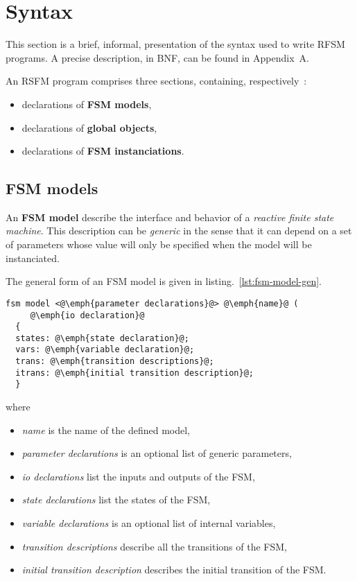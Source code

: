 \chapter{Syntax}
\label{chap:syntax}

This section is a brief, informal, presentation of the syntax used to write RFSM programs. A
precise description, in BNF, can be found in Appendix~A.

\bigskip
An RSFM program comprises three sections, containing, respectively~:
\begin{itemize}
\item declarations of \textbf{FSM models},
\item declarations of \textbf{global objects},
\item declarations of \textbf{FSM instanciations}.
\end{itemize}

\section{FSM models}
\label{sec:fsm-models}

An \textbf{FSM model} describe the interface and behavior of a \emph{reactive finite state
  machine}. This description can be \emph{generic} in the sense that it can depend on a set of
parameters whose value will only be specified when the model will be instanciated.

The general form of an FSM model is given in listing.~\ref{lst:fsm-model-gen}.

\begin{lstlisting}[language=Rfsm,frame=single,caption=Overall syntax for FSM models,label=lst:fsm-model-gen]
fsm model <@\emph{parameter declarations}@> @\emph{name}@ (
     @\emph{io declaration}@
  {
  states: @\emph{state declaration}@;
  vars: @\emph{variable declaration}@;
  trans: @\emph{transition descriptions}@;
  itrans: @\emph{initial transition description}@;
  }
\end{lstlisting}

where
\begin{itemize}
\item \emph{name} is the name of the defined model,
\item \emph{parameter declarations} is an optional list of generic parameters,
\item \emph{io declarations} list the inputs and outputs of the FSM,
\item \emph{state declarations} list the states of the FSM,
\item \emph{variable declarations} is an optional list of internal variables,
\item \emph{transition descriptions} describe all the transitions of the FSM,
\item \emph{initial transition description} describes the initial transition of the FSM.
\end{itemize}

